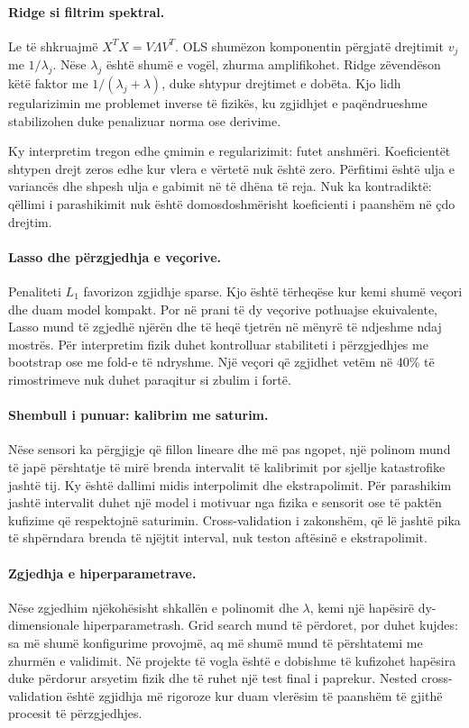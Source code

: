\documentclass[12pt,a4paper,oneside]{book}
\begin{document}
\paragraph{Ridge si filtrim spektral.}
Le të shkruajmë $X^TX=V\Lambda V^T$. OLS shumëzon komponentin përgjatë drejtimit $v_j$ me $1/\lambda_j$. Nëse $\lambda_j$ është shumë e vogël, zhurma amplifikohet. Ridge zëvendëson këtë faktor me $1/(\lambda_j+\lambda)$, duke shtypur drejtimet e dobëta. Kjo lidh regularizimin me problemet inverse të fizikës, ku zgjidhjet e paqëndrueshme stabilizohen duke penalizuar norma ose derivime.

Ky interpretim tregon edhe çmimin e regularizimit: futet anshmëri. Koeficientët shtypen drejt zeros edhe kur vlera e vërtetë nuk është zero. Përfitimi është ulja e variancës dhe shpesh ulja e gabimit në të dhëna të reja. Nuk ka kontradiktë: qëllimi i parashikimit nuk është domosdoshmërisht koeficienti i paanshëm në çdo drejtim.

\paragraph{Lasso dhe përzgjedhja e veçorive.}
Penaliteti $L_1$ favorizon zgjidhje sparse. Kjo është tërheqëse kur kemi shumë veçori dhe duam model kompakt. Por në prani të dy veçorive pothuajse ekuivalente, Lasso mund të zgjedhë njërën dhe të heqë tjetrën në mënyrë të ndjeshme ndaj mostrës. Për interpretim fizik duhet kontrolluar stabiliteti i përzgjedhjes me bootstrap ose me fold-e të ndryshme. Një veçori që zgjidhet vetëm në 40\% të rimostrimeve nuk duhet paraqitur si zbulim i fortë.

\paragraph{Shembull i punuar: kalibrim me saturim.}
Nëse sensori ka përgjigje që fillon lineare dhe më pas ngopet, një polinom mund të japë përshtatje të mirë brenda intervalit të kalibrimit por sjellje katastrofike jashtë tij. Ky është dallimi midis interpolimit dhe ekstrapolimit. Për parashikim jashtë intervalit duhet një model i motivuar nga fizika e sensorit ose të paktën kufizime që respektojnë saturimin. Cross-validation i zakonshëm, që lë jashtë pika të shpërndara brenda të njëjtit interval, nuk teston aftësinë e ekstrapolimit.

\paragraph{Zgjedhja e hiperparametrave.}
Nëse zgjedhim njëkohësisht shkallën e polinomit dhe $\lambda$, kemi një hapësirë dy-dimensionale hiperparametrash. Grid search mund të përdoret, por duhet kujdes: sa më shumë konfigurime provojmë, aq më shumë mund të përshtatemi me zhurmën e validimit. Në projekte të vogla është e dobishme të kufizohet hapësira duke përdorur arsyetim fizik dhe të ruhet një test final i paprekur. Nested cross-validation është zgjidhja më rigoroze kur duam vlerësim të paanshëm të gjithë procesit të përzgjedhjes.
\end{document}
